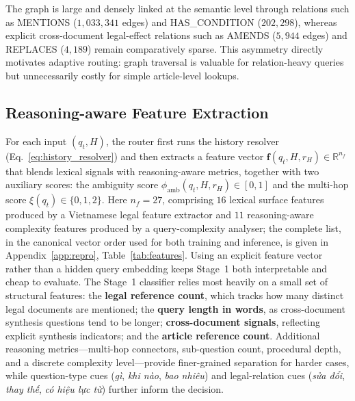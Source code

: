 The graph is large and densely linked at the semantic level through relations
such as \textsc{MENTIONS} ($1{,}033{,}341$ edges) and \textsc{HAS\_CONDITION}
($202{,}298$), whereas explicit cross-document legal-effect relations such as
\textsc{AMENDS} ($5{,}944$ edges) and \textsc{REPLACES} ($4{,}189$) remain
comparatively sparse. This asymmetry directly motivates adaptive routing:
graph traversal is valuable for relation-heavy queries but unnecessarily
costly for simple article-level lookups.

\subsection{Reasoning-aware Feature Extraction}\label{subsec:features}

For each input $(q_t,H)$, the router first runs the history resolver
(Eq.~\ref{eq:history_resolver}) and then extracts a feature vector
$\mathbf{f}(q_t,H,r_H)\in\mathbb{R}^{n_f}$ that blends lexical signals with
reasoning-aware metrics, together with two auxiliary scores: the ambiguity
score $\phi_{\mathrm{amb}}(q_t,H,r_H)\in[0,1]$ and the multi-hop score
$\xi(q_t)\in\{0,1,2\}$.
Here $n_f=27$, comprising $16$ lexical surface features produced by a
Vietnamese legal feature extractor and $11$ reasoning-aware complexity
features produced by a query-complexity analyser; the complete list, in the
canonical vector order used for both training and inference, is given in
Appendix~\ref{app:repro}, Table~\ref{tab:features}. Using an explicit feature
vector rather than a hidden query embedding keeps Stage~1 both interpretable
and cheap to evaluate.
The Stage~1 classifier relies most heavily on a small set of structural
features: the \textbf{legal reference count}, which tracks how many distinct
legal documents are mentioned; the \textbf{query length in words}, as
cross-document synthesis questions tend to be longer;
\textbf{cross-document signals}, reflecting explicit synthesis indicators;
and the \textbf{article reference count}. Additional reasoning
metrics---multi-hop connectors, sub-question count, procedural depth, and a
discrete complexity level---provide finer-grained separation for harder
cases, while question-type cues (\textit{gì}, \textit{khi nào},
\textit{bao nhiêu}) and legal-relation cues (\textit{sửa đổi},
\textit{thay thế}, \textit{có hiệu lực từ}) further inform the decision.

